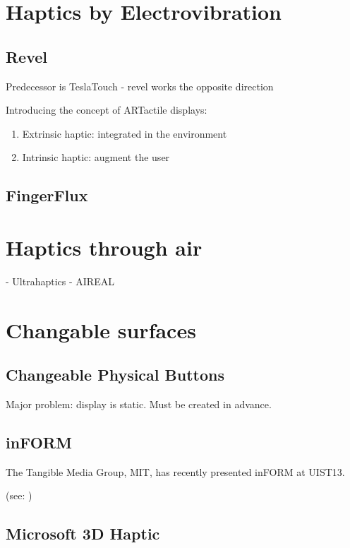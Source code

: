 \section{Haptics by Electrovibration}


\subsection{Revel}

Predecessor is TeslaTouch - revel works the opposite direction

Introducing the concept of ARTactile displays: 
\begin{enumerate}
	\item Extrinsic haptic: integrated in the environment
    \item Intrinsic haptic: augment the user
\end{enumerate}

\subsection{FingerFlux}

\section{Haptics through air}
- Ultrahaptics
- AIREAL


\section{Changable surfaces}


\subsection{Changeable Physical Buttons}

Major problem: display is static. Must be created in advance.

\subsection{inFORM}

The Tangible Media Group, MIT, has recently presented inFORM at UIST13. 

(see: \cite{follmer2013inform})

\subsection{Microsoft 3D Haptic}

